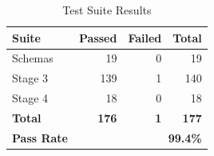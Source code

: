 \begin{table}[htbp]
\centering
\caption{Test Suite Results}
\label{tab:test-suite}
\begin{tabular}{@{}lrrr@{}}
\toprule
\textbf{Suite} & \textbf{Passed} & \textbf{Failed} & \textbf{Total} \\
\midrule
Schemas  &  19 & 0 &  19 \\
Stage 3  & 139 & 1 & 140 \\
Stage 4  &  18 & 0 &  18 \\
\midrule
\textbf{Total} & \textbf{176} & \textbf{1} & \textbf{177} \\
\textbf{Pass Rate} & \multicolumn{3}{r}{\textbf{99.4\%}} \\
\bottomrule
\end{tabular}
\end{table}